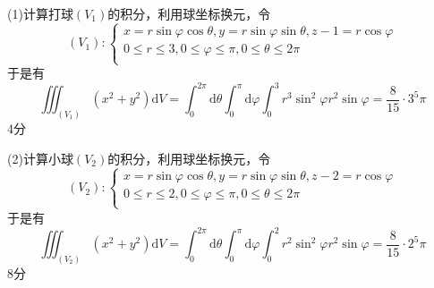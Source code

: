 \documentclass[hideanswer=false,
	enfont=newtxtext,
	zhfont=empty,
	mathfont=newtxmath,
]{cmcthesis}
\begin{document}
	\begin{answer}
	\begin{solution}
(1)计算打球$(V_1)$的积分，利用球坐标换元，令
	\[
	\left(V_1\right):\left\{\begin{array}{l}
	x=r\sin\varphi\cos\theta ,y=r\sin\varphi\sin\theta ,z-1=r\cos\varphi\\
	0\leq r\leq 3,0\leq\varphi\leq\pi ,0\leq\theta\leq 2\pi\\
	\end{array}\right. 
	\]
于是有
	\[
	\iiint _ { \left( V _ { 1 } \right) } \left( x ^ { 2 } + y ^ { 2 } \right) \mathrm { d } V = \int _ { 0 } ^ { 2 \pi } \mathrm { d } \theta \int _ { 0 } ^ { \pi }\mathrm { d } \varphi \int _ { 0 } ^ { 3 } r ^ { 3 } \sin ^ { 2 } \varphi r ^ { 2 } \sin \varphi = \frac { 8 } { 15 } \cdot 3 ^ { 5 } \pi
	\]
\hfill\dotfill 4分

(2)计算小球$(V_2)$的积分，利用球坐标换元，令
	\[
	\left(V_2\right):\left\{\begin{array}{l}
	x=r\sin\varphi\cos\theta ,y=r\sin\varphi\sin\theta ,z-2=r\cos\varphi\\
	0\leq r\leq 2,0\leq\varphi\leq\pi ,0\leq\theta\leq 2\pi\\
	\end{array}\right. 
	\]
于是有
	\[
	\iiint _ { \left( V _ { 2} \right) } \left( x ^ { 2 } + y ^ { 2 } \right) \mathrm { d } V = \int _ { 0 } ^ { 2 \pi } \mathrm { d } \theta \int _ { 0 } ^ { \pi }\mathrm { d } \varphi \int _ { 0 } ^ { 2 } r ^ { 2 } \sin ^ { 2 } \varphi r ^ { 2 } \sin \varphi = \frac { 8 } { 15 } \cdot 2^ { 5 } \pi
	\]
\hfill\dotfill 8分


\end{solution}
\end{answer}
\end{document}
